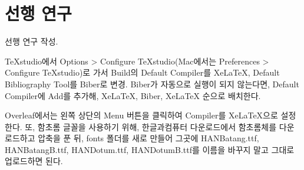 \section{선행 연구}
선행 연구 작성.

TeXstudio에서 Options > Configure TeXstudio(Mac에서는 Preferences > Configure TeXstudio)로 가서 Build의 Default Compiler를 XeLaTeX, Default Bibliography Tool를 Biber로 변경. Biber가 자동으로 실행이 되지 않는다면, Default Compiler에 Add를 추가해, XeLaTeX, Biber, XeLaTeX 순으로 배치한다.

Overleaf에서는 왼쪽 상단의 Menu 버튼을 클릭하여 Compiler를 XeLaTeX으로 설정한다. 또, 함초롬 글꼴을 사용하기 위해, 한글과컴퓨터 다운로드에서 함초롬체를 다운로드하고 압축을 푼 뒤, fonts 폴더를 새로 만들어 그곳에 HANBatang.ttf, HANBatangB.ttf, HANDotum.ttf, HANDotumB.ttf를 이름을 바꾸지 말고 그대로 업로드하면 된다.
